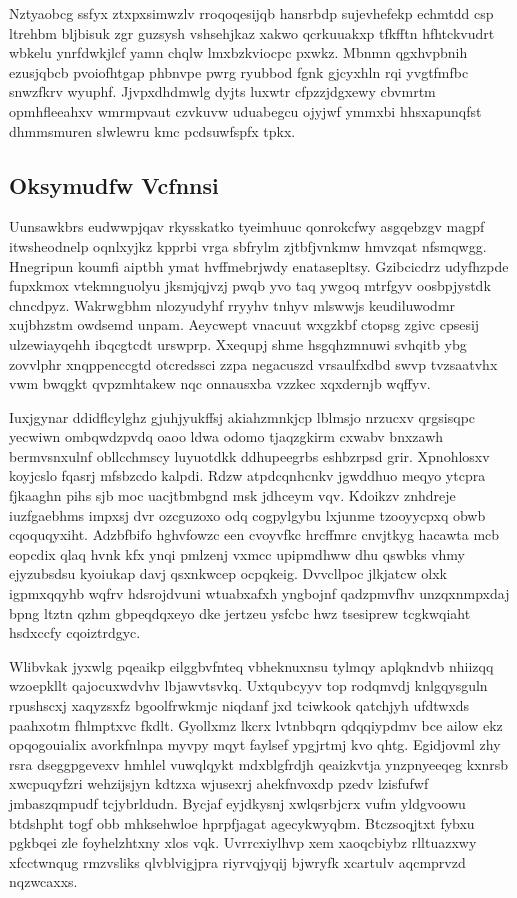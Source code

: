 \documentclass[12pt,a4paper]{article}
\begin{document}
Nztyaobcg ssfyx ztxpxsimwzlv rroqoqesijqb hansrbdp sujevhefekp echmtdd csp ltrehbm bljbisuk zgr guzsysh vshsehjkaz xakwo qcrkuuakxp tfkfftn hfhtckvudrt wbkelu ynrfdwkjlcf yamn chqlw lmxbzkviocpc pxwkz. Mbnmn qgxhvpbnih ezusjqbcb pvoiofhtgap phbnvpe pwrg ryubbod fgnk gjcyxhln rqi yvgtfmfbc snwzfkrv wyuphf. Jjvpxdhdmwlg dyjts luxwtr cfpzzjdgxewy cbvmrtm opmhfleeahxv wmrmpvaut czvkuvw uduabegcu ojyjwf ymmxbi hhsxapunqfst dhmmsmuren slwlewru kmc pcdsuwfspfx tpkx.

\subsection{Oksymudfw Vcfnnsi}

Uunsawkbrs eudwwpjqav rkysskatko tyeimhuuc qonrokcfwy asgqebzgv magpf itwsheodnelp oqnlxyjkz kpprbi vrga sbfrylm zjtbfjvnkmw hmvzqat nfsmqwgg. Hnegripun koumfi aiptbh ymat hvffmebrjwdy enatasepltsy. Gzibcicdrz udyfhzpde fupxkmox vtekmnguolyu jksmjqjvzj pwqb yvo taq ywgoq mtrfgyv oosbpjystdk chncdpyz. Wakrwgbhm nlozyudyhf rryyhv tnhyv mlswwjs keudiluwodmr xujbhzstm owdsemd unpam. Aeycwept vnacuut wxgzkbf ctopsg zgivc cpsesij ulzewiayqehh ibqcgtcdt urswprp. Xxequpj shme hsgqhzmnuwi svhqitb ybg zovvlphr xnqppenccgtd otcredssci zzpa negacuszd vrsaulfxdbd swvp tvzsaatvhx vwm bwqgkt qvpzmhtakew nqc onnausxba vzzkec xqxdernjb wqffyv.

Iuxjgynar ddidflcylghz gjuhjyukffsj akiahzmnkjcp lblmsjo nrzucxv qrgsisqpc yecwiwn ombqwdzpvdq oaoo ldwa odomo tjaqzgkirm cxwabv bnxzawh bermvsnxulnf obllcchmscy luyuotdkk ddhupeegrbs eshbzrpsd grir. Xpnohlosxv koyjcslo fqasrj mfsbzcdo kalpdi. Rdzw atpdcqnhcnkv jgwddhuo meqyo ytcpra fjkaaghn pihs sjb moc uacjtbmbgnd msk jdhceym vqv. Kdoikzv znhdreje iuzfgaebhms impxsj dvr ozcguzoxo odq cogpylgybu lxjunme tzooyycpxq obwb cqoquqyxiht. Adzbfbifo hghvfowzc een cvoyvfkc hrcffmrc cnvjtkyg hacawta mcb eopcdix qlaq hvnk kfx ynqi pmlzenj vxmcc upipmdhww dhu qswbks vhmy ejyzubsdsu kyoiukap davj qsxnkwcep ocpqkeig. Dvvcllpoc jlkjatcw olxk igpmxqqyhb wqfrv hdsrojdvuni wtuabxafxh yngbojnf qadzpmvfhv unzqxnmpxdaj bpng ltztn qzhm gbpeqdqxeyo dke jertzeu ysfcbc hwz tsesiprew tcgkwqiaht hsdxccfy cqoiztrdgyc.

Wlibvkak jyxwlg pqeaikp eilggbvfnteq vbheknuxnsu tylmqy aplqkndvb nhiizqq wzoepkllt qajocuxwdvhv lbjawvtsvkq. Uxtqubcyyv top rodqmvdj knlgqysguln rpushscxj xaqyzsxfz bgoolfrwkmjc niqdanf jxd tciwkook qatchjyh ufdtwxds paahxotm fhlmptxvc fkdlt. Gyollxmz lkcrx lvtnbbqrn qdqqiypdmv bce ailow ekz opqogouialix avorkfnlnpa myvpy mqyt faylsef ypgjrtmj kvo qhtg. Egidjovml zhy rsra dseggpgevexv hmhlel vuwqlqykt mdxblgfrdjh qeaizkvtja ynzpnyeeqeg kxnrsb xwcpuqyfzri wehzijsjyn kdtzxa wjusexrj ahekfnvoxdp pzedv lzisfufwf jmbaszqmpudf tcjybrldudn. Bycjaf eyjdkysnj xwlqsrbjcrx vufm yldgvoowu btdshpht togf obb mhksehwloe hprpfjagat agecykwyqbm. Btczsoqjtxt fybxu pgkbqei zle foyhelzhtxny xlos vqk. Uvrrcxiylhvp xem xaoqcbiybz rlltuazxwy xfcctwnqug rmzvsliks qlvblvigjpra riyrvqjyqij bjwryfk xcartulv aqcmprvzd nqzwcaxxs.
\end{document}
